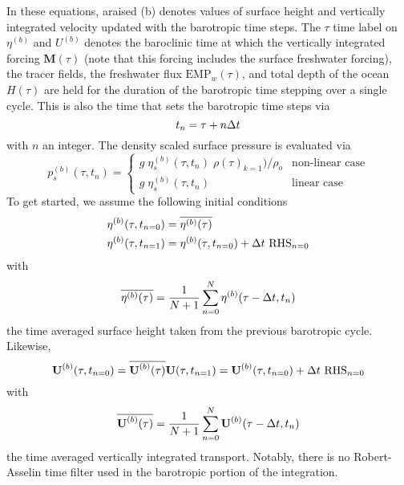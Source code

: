 \documentclass[NEMO_book]{subfiles}
\begin{document}
{In these equations, araised (b) denotes values of surface height and vertically integrated velocity updated with the barotropic time steps. The $\tau$ time label on $\eta^{(b)}$ 
and $U^{(b)}$ denotes the baroclinic time at which the vertically integrated forcing $\textbf{M}(\tau)$ (note that this forcing includes the surface freshwater forcing), the tracer fields, the freshwater flux $\text{EMP}_w(\tau)$, and total depth of the ocean $H(\tau)$ are held for the duration of the barotropic time stepping over a single cycle. This is also the time 
that sets the barotropic time steps via 
\begin{equation} \label{DYN_spg_ts_t}
t_n=\tau+n\Delta t   
\end{equation}
with $n$ an integer. The density scaled surface pressure is evaluated via 
\begin{equation} \label{DYN_spg_ts_ps}
p_s^{(b)}(\tau,t_{n}) = \begin{cases}
	g \;\eta_s^{(b)}(\tau,t_{n}) \;\rho(\tau)_{k=1}) / \rho_o  &      \text{non-linear case} \\
	g \;\eta_s^{(b)}(\tau,t_{n})  &      \text{linear case} 
	\end{cases}
\end{equation}
To get started, we assume the following initial conditions 
\begin{equation} \label{DYN_spg_ts_eta}
\begin{split}
\eta^{(b)}(\tau,t_{n=0}) &= \overline{\eta^{(b)}(\tau)}
\\
\eta^{(b)}(\tau,t_{n=1}) &= \eta^{(b)}(\tau,t_{n=0}) + \rdt \ \text{RHS}_{n=0} 
\end{split}
\end{equation}
with 
\begin{equation} \label{DYN_spg_ts_etaF}
 \overline{\eta^{(b)}(\tau)} = \frac{1}{N+1} \sum\limits_{n=0}^N \eta^{(b)}(\tau-\Delta t,t_{n})
\end{equation}
the time averaged surface height taken from the previous barotropic cycle. Likewise, 
\begin{equation} \label{DYN_spg_ts_u}
\textbf{U}^{(b)}(\tau,t_{n=0}) = \overline{\textbf{U}^{(b)}(\tau)}	\\
\\
\textbf{U}(\tau,t_{n=1}) = \textbf{U}^{(b)}(\tau,t_{n=0}) + \rdt \ \text{RHS}_{n=0}  	
\end{equation}
with 
\begin{equation} \label{DYN_spg_ts_u}
 \overline{\textbf{U}^{(b)}(\tau)} 
 	= \frac{1}{N+1} \sum\limits_{n=0}^N\textbf{U}^{(b)}(\tau-\Delta t,t_{n})
\end{equation}
the time averaged vertically integrated transport. Notably, there is no Robert-Asselin time filter used in the barotropic portion of the integration. 

}
\end{document}

